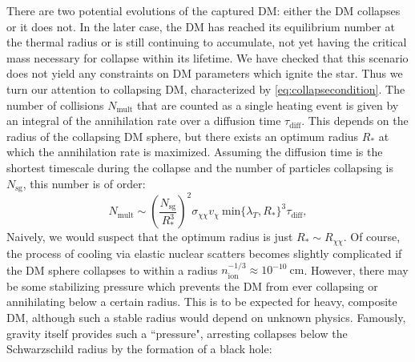 \documentclass[preprintnumbers,amsmath,amssymb,prd,superscriptaddress]{revtex4}
\def\r{\right)}
\def\l{\left(}
\begin{document}
There are two potential evolutions of the captured DM: either the DM collapses or it does not. 
In the later case, the DM has reached its equilibrium number at the thermal radius or is still continuing to accumulate, not yet having the critical mass necessary for collapse within its lifetime.
We have checked that this scenario does not yield any constraints on DM parameters which ignite the star. 
Thus we turn our attention to collapsing DM, characterized by \eqref{eq:collapsecondition}. 
The number of collisions $N_\text{mult}$ that are counted as a single heating event is given by an integral of the annihilation rate over a diffusion time $\tau_\text{diff}$.
This depends on the radius of the collapsing DM sphere, but there exists an optimum radius $R_*$ at which the annihilation rate is maximized.
Assuming the diffusion time is the shortest timescale during the collapse and the number of particles collapsing is $N_\text{sg}$, this number is of order:
\begin{equation}
\label{eq:nmulti}
N_\text{mult} \sim \l \frac{N_\text{sg}}{R_*^3}\r^2  \sigma_{\chi \chi} v_\chi ~\text{min}\{\lambda_T, R_*\}^3 \tau_\text{diff},
\end{equation}
Naively, we would suspect that the optimum radius is just $R_* \sim R_{\chi \chi}$. 
Of course, the process of cooling via elastic nuclear scatters becomes slightly complicated if the DM sphere collapses to within a radius $n_\text{ion}^{-1/3} \approx 10^{-10} ~\text{cm}$. 
However, there may be some stabilizing pressure which prevents the DM from ever collapsing or annihilating below a certain radius.
This is to be expected for heavy, composite DM, although such a stable radius would depend on unknown physics. 
Famously, gravity itself provides such a ``pressure", arresting collapses below the Schwarzschild radius by the formation of a black hole:
\end{document}
